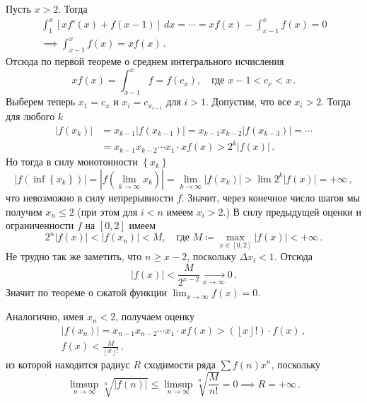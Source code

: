 \documentclass[a4paper, 12pt]{article}
\begin{document}
Пусть \({ x > 2 }\).
Тогда
\begin{multline*}
    \int_{1}^{x} \left[ xf'(x) + f(x-1) \right]\: dx = \cdots = xf(x) - \int_{x-1}^{x} f(x) = 0 \\
    \implies \int_{x-1}^{x} f(x) = xf(x)\,.
\end{multline*}
Отсюда по первой теореме о среднем интегрального исчисления
\[
    xf(x) = \int_{x-1}^{x} f = f(c_x), \quad \text{где } x - 1 < c_x < x\,.
\]
Выберем теперь \({ x_1 = c_x }\) и \({ x_i = c_{x_{i-1}}}\) для \({ i > 1 }\).
Допустим, что все \({ x_i > 2 }\). Тогда для любого \({ k }\)
\begin{align*}
    \left\lvert f(x_k) \right\rvert &= x_{k-1}\left\lvert f(x_{k-1}) \right\rvert = x_{k-1}x_{k-2}\left\lvert f(x_{k-3}) \right\rvert = \cdots \\
    &= x_{k-1}x_{k-2} \cdots x_{1} \cdot xf(x) > 2^{k} \left\lvert f(x) \right\rvert\,.
\end{align*}
Но тогда в силу монотонности \({ \left\{ x_k \right\} }\)
\[
    \left\lvert f\left(\inf \left\{ x_k \right\}\right) \right\rvert = \left\lvert f\left(\lim_{k \to \infty} x_k\right) \right\rvert = \lim_{k \to \infty} \left\lvert f(x_k) \right\rvert > \lim 2^{k}\left\lvert f(x) \right\rvert
    = +\infty\,,
\]
что невозможно в силу непрерывности \({ f }\). Значит, через конечное число шагов мы получим \({ x_n \leqslant 2 }\) (при этом для \({ i < n }\) имеем \({ x_i > 2 }\).) В силу предыдущей оценки и ограниченности \({ f }\) на \({ [0, 2] }\) имеем
\[
    2^{n}\left\lvert f(x) \right\rvert < \left\lvert f(x_n) \right\rvert < M, \quad \text{где } M \coloneqq \max_{x \in [0, 2]} \left\lvert f(x) \right\rvert < +\infty\,.
\]
Не трудно так же заметить, что \({ n \geqslant x - 2 }\), поскольку \({ \Delta x_i < 1 }\). Отсюда
\[
    \left\lvert f(x) \right\rvert < \frac{M}{2^{x-2}} \underset{x \to \infty}{\mapsto} 0\,.
\]
Значит по теореме о сжатой функции \({ \lim_{x \to \infty} f(x) = 0 }\).

Аналогично, имея \({ x_n < 2 }\), получаем оценку
\[
    \begin{gathered}
        \left\lvert f(x_n) \right\rvert = x_{n-1}x_{n-2} \cdots x_{1} \cdot xf(x) > \left(\left\lfloor x \right\rfloor! \right) \cdot f(x)\,, \\
        f(x) < \frac{M}{\left\lfloor x \right\rfloor!}\,,
    \end{gathered}
\]
из которой находится радиус \({ R }\) сходимости ряда \({ \sum f(n) x^{n} }\), поскольку
\[
    \limsup_{n \to \infty} \sqrt[n]{\left\lvert f(n) \right\rvert} \leqslant \limsup_{n \to \infty} \sqrt[n]{\frac{M}{n!}} = 0 \implies R = +\infty\,.
\]
\end{document}
